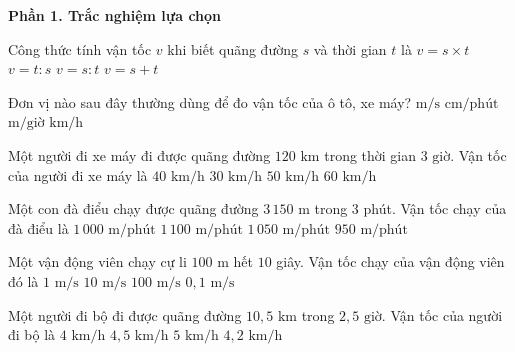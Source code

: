 \textbf{Phần 1. Trắc nghiệm lựa chọn}

\begin{ex} %
Công thức tính vận tốc $v$ khi biết quãng đường $s$ và thời gian $t$ là
\choice
{$v = s \times t$}
{$v = t : s$}
{\True $v = s : t$}
{$v = s + t$}
\end{ex}

\begin{ex} %
Đơn vị nào sau đây thường dùng để đo vận tốc của ô tô, xe máy?
\choice
{$\text{m/s}$}
{$\text{cm/phút}$}
{$\text{m/giờ}$}
{\True $\text{km/h}$}
\end{ex}

\begin{ex} %
Một người đi xe máy đi được quãng đường $120\text{ km}$ trong thời gian $3\text{ giờ}$. Vận tốc của người đi xe máy là
\choice
{\True $40\text{ km/h}$}
{$30\text{ km/h}$}
{$50\text{ km/h}$}
{$60\text{ km/h}$}
\end{ex}

\begin{ex} %
Một con đà điểu chạy được quãng đường $3\,150\text{ m}$ trong $3$ phút. Vận tốc chạy của đà điểu là
\choice
{$1\,000\text{ m/phút}$}
{$1\,100\text{ m/phút}$}
{\True $1\,050\text{ m/phút}$}
{$950\text{ m/phút}$}
\end{ex}

\begin{ex} %
Một vận động viên chạy cự li $100\text{ m}$ hết $10$ giây. Vận tốc chạy của vận động viên đó là
\choice
{$1\text{ m/s}$}
{\True $10\text{ m/s}$}
{$100\text{ m/s}$}
{$0{,}1\text{ m/s}$}
\end{ex}

\begin{ex} %
Một người đi bộ đi được quãng đường $10{,}5\text{ km}$ trong $2{,}5\text{ giờ}$. Vận tốc của người đi bộ là
\choice
{$4\text{ km/h}$}
{$4{,}5\text{ km/h}$}
{$5\text{ km/h}$}
{\True $4{,}2\text{ km/h}$}
\end{ex}

